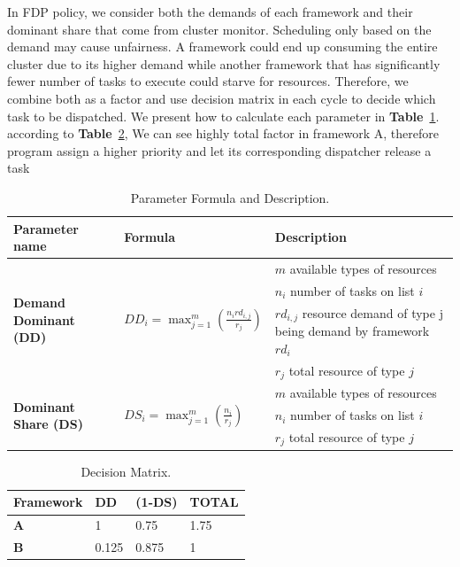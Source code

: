 \documentclass[12pt,oneside,openright,a4paper]{cpe-english-project}
\begin{document}
\begin{enumerate}
\hspace{10mm}In FDP policy, we consider both the demands of each framework and their dominant share that come from cluster monitor. Scheduling only based on the demand may cause unfairness. A framework could end up consuming the entire cluster due to its higher demand while another framework that has significantly fewer number of tasks to execute could starve for resources. Therefore, we combine both as a factor and use decision matrix in each cycle to decide which task to be dispatched. We present how to calculate each parameter in \textbf{Table}~\ref{tbl:Parameter}. according to \textbf{Table}~\ref{tbl:DecisionMatrix}, We can see highly total factor in framework A, therefore program assign a higher priority and let its corresponding dispatcher release a task

  \begin{table}[!h]
    \caption{Parameter Formula and Description.}\label{tbl:Parameter}
    \begin{tabular}{@{}|p{}|p{}|p{}|}
      \hline
      \textbf{Parameter name} & \textbf{Formula} & \textbf{Description} \\ 
      \hline
      \multirow{4}{*}{\textbf{Demand Dominant (DD)}} & \multirow{4}{*}{$DD_i = \max_{j=1}^{m}(\frac{n_ird_{i,j}}{r_j})$} & $m$ available types of resources\\ 
      \cline{3-3} & & $n_i$ number of tasks on list $i$\\ 
      \cline{3-3} & & $rd_{i,j}$ resource demand of type j being demand by framework $rd_i $\\ 
      \cline{3-3} & & $r_j$ total resource of type $j$\\ 
      \hline
      \multirow{3}{*}{\textbf{Dominant Share (DS)}} & \multirow{3}{*}{$DS_i = \max_{j=1}^{m}(\frac{n_i}{r_j})$} & $m$ available types of resources \\ 
      \cline{3-3} & & $n_i$ number of tasks on list $i$ \\
      \cline{3-3} & & $r_j$ total resource of type $j$ \\ 
      \hline
    \end{tabular}
  \end{table}

  \begin{table}[!h]
    \caption{Decision Matrix.}\label{tbl:DecisionMatrix}
      \begin{tabular}{@{}|p{}|p{}|p{}|p{}|}
      \hline
      \textbf{Framework} & \textbf{DD} & \textbf{(1-DS)} & \textbf{TOTAL}\\
      \hline
      \textbf{A} & 1 & 0.75 & 1.75\\
      \hline
      \textbf{B} & 0.125 & 0.875 & 1\\
      \hline
    \end{tabular}
  \end{table}
  

\end{enumerate}
\end{document}
